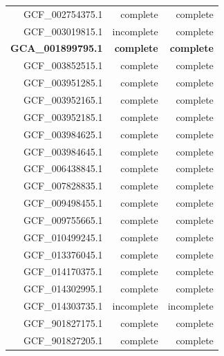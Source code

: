 \documentclass[sn-mathphys,Numbered]{sn-jnl}  %
\theoremstyle{thmstyleone}%
\theoremstyle{thmstyletwo}%
\theoremstyle{thmstylethree}%
\begin{document}
\begin{appendices}
\begin{table}[h!]
\begin{tabular}{rrr}
                GCF\_002754375.1 & complete               & complete                   \\
                GCF\_003019815.1 & incomplete             & complete                   \\
                \textbf{GCA\_001899795.1} & \textbf{complete}    &   \textbf{complete} \\
                GCF\_003852515.1 & complete               & complete                   \\
                GCF\_003951285.1 & complete               & complete                   \\
                GCF\_003952165.1 & complete               & complete                   \\
                GCF\_003952185.1 & complete               & complete                   \\
                GCF\_003984625.1 & complete               & complete                   \\
                GCF\_003984645.1 & complete               & complete                   \\
                GCF\_006438845.1 & complete               & complete                   \\
                GCF\_007828835.1 & complete               & complete                   \\
                GCF\_009498455.1 & complete               & complete                   \\
                GCF\_009755665.1 & complete               & complete                   \\
                GCF\_010499245.1 & complete               & complete                   \\
                GCF\_013376045.1 & complete               & complete                   \\
                GCF\_014170375.1 & complete               & complete                   \\
                GCF\_014302995.1 & complete               & complete                   \\
                GCF\_014303735.1 & incomplete             & incomplete                 \\
                GCF\_901827175.1 & complete               & complete                   \\ 
                GCF\_901827205.1 & complete               & complete              
            \end{tabular}
        \end{table}
    


\end{appendices}
\end{document}
